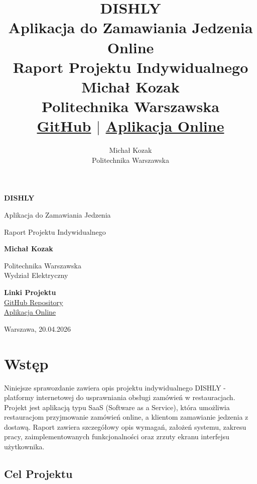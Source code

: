 ﻿\documentclass[12pt,a4paper,utf-8]{article}
\title{%
    \textbf{DISHLY} \\
    \large Aplikacja do Zamawiania Jedzenia Online \\
    \large Raport Projektu Indywidualnego \\
    \vspace{0.3cm}
    \normalsize Michał Kozak \\
    \small Politechnika Warszawska \\
    \vspace{0.5cm}
    \tiny \href{https://github.com/podlaskialgorytm3/dishly}{GitHub} $|$ \href{https://dishly-ochre.vercel.app/}{Aplikacja Online}
}
\author{Michał Kozak \\ Politechnika Warszawska}
\date{}
\begin{document}
\begin{titlepage}
    \centering
    \vspace*{2cm}
    
    {\LARGE \textbf{DISHLY}}
    
    \vspace{0.5cm}
    
    {\Huge Aplikacja do Zamawiania Jedzenia}
    
    \vspace{2cm}
    
    {\Large Raport Projektu Indywidualnego}
    
    \vspace{3cm}
    
    {\Large \textbf{Michał Kozak}}
    
    \vspace{2cm}
    
    {\large Politechnika Warszawska} \\
    {\normalsize Wydział Elektryczny}
    
    \vspace{3cm}
    
    {\normalsize \textbf{Linki Projektu}} \\
    \href{https://github.com/podlaskialgorytm3/dishly}{GitHub Repository} \\
    \href{https://dishly-ochre.vercel.app/}{Aplikacja Online}
    
    \vfill
    
    {\normalsize Warszawa, 20.04.2026}
    
\end{titlepage}

\cleardoublepage

\tableofcontents
\newpage

\section{Wstęp}

Niniejsze sprawozdanie zawiera opis projektu indywidualnego DISHLY - platformy internetowej do usprawniania obsługi zamówień w restauracjach. Projekt jest aplikacją typu SaaS (Software as a Service), która umożliwia restauracjom przyjmowanie zamówień online, a klientom zamawianie jedzenia z dostawą. Raport zawiera szczegółowy opis wymagań, założeń systemu, zakresu pracy, zaimplementowanych funkcjonalności oraz zrzuty ekranu interfejsu użytkownika.

\subsection{Cel Projektu}
\end{document}
